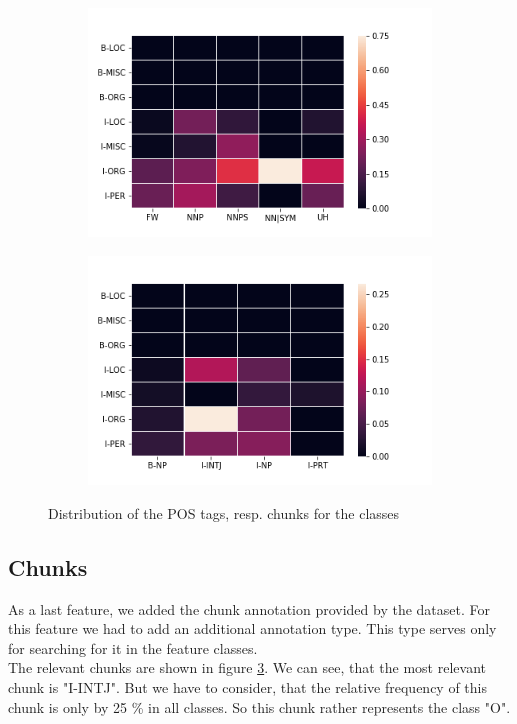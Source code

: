 \documentclass[noindent, nochapname]{tudexercise}
\begin{document}
			\begin{figure}[h]
				\begin{subfigure}[c]{0.5\textwidth}
					\includegraphics[scale=0.6]{img/pos_per_class.png}
					\label{fig:pos_per_class}
				\end{subfigure}
				\begin{subfigure}[c]{0.5\textwidth}
					\includegraphics[scale=0.6]{img/chunks_per_class.png}
					\label{fig:chunks_per_class}
				\end{subfigure}
				\caption{Distribution of the POS tags, resp. chunks for the classes}
			\end{figure}
		
		\subsection{Chunks}
			As a last feature, we added the chunk annotation provided by the dataset. For this feature we had to add an additional annotation type. This type serves only for searching for it in the feature classes.\\
			The relevant chunks are shown in figure \ref{fig:chunks_per_class}. We can see, that the most relevant chunk is "I-INTJ". But we have to consider, that the relative frequency of this chunk is only by 25 \% in all classes. So this chunk rather represents the class "O". 
\end{document}
